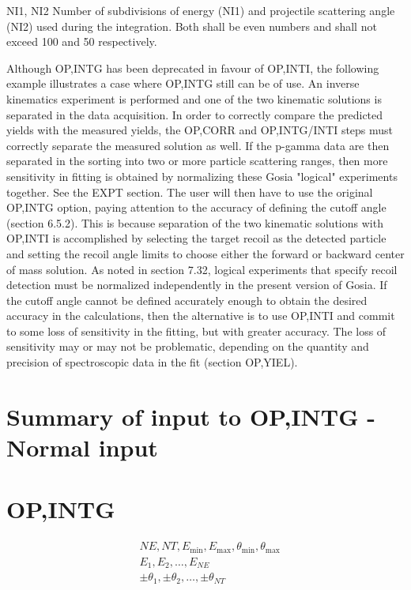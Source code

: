 \documentclass[10pt]{article}
\begin{document}
NI1, NI2 Number of subdivisions of energy (NI1) and projectile scattering angle (NI2) used during the integration. Both shall be even numbers and shall not exceed 100 and 50 respectively.

Although OP,INTG has been deprecated in favour of OP,INTI, the following example illustrates a case where OP,INTG still can be of use. An inverse kinematics experiment is performed and one of the two kinematic solutions is separated in the data acquisition. In order to correctly compare the predicted yields with the measured yields, the OP,CORR and OP,INTG/INTI steps must correctly separate the measured solution as well. If the p-gamma data are then separated in the sorting into two or more particle scattering ranges, then more sensitivity in fitting is obtained by normalizing these Gosia "logical" experiments together. See the EXPT section. The user will then have to use the original OP,INTG option, paying attention to the accuracy of defining the cutoff angle (section 6.5.2). This is because separation of the two kinematic solutions with OP,INTI is accomplished by selecting the target recoil as the detected particle and setting the recoil angle limits to choose either the forward or backward center of mass solution. As noted in section 7.32, logical experiments that specify recoil detection must be normalized independently in the present version of Gosia. If the cutoff angle cannot be defined accurately enough to obtain the desired accuracy in the calculations, then the alternative is to use OP,INTI and commit to some loss of sensitivity in the fitting, but with greater accuracy. The loss of sensitivity may or may not be problematic, depending on the quantity and precision of spectroscopic data in the fit (section OP,YIEL).

\section*{Summary of input to OP,INTG - Normal input}
\section*{OP,INTG}
$$
\begin{aligned}
& N E, N T, E_{\min }, E_{\max }, \theta_{\min }, \theta_{\max } \\
& E_{1}, E_{2}, \ldots, E_{N E} \\
& \pm \theta_{1}, \pm \theta_{2}, \ldots, \pm \theta_{N T}
\end{aligned}
$$
\end{document}
